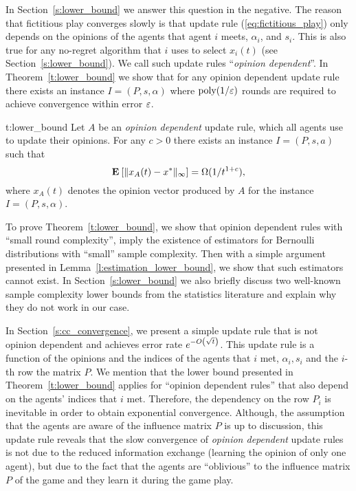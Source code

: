 In Section~\ref{s:lower_bound} we answer this question in the negative.
The reason that fictitious play converges slowly is that
update rule (\ref{eq:fictitious_play})
only depends on the opinions of the agents that agent $i$ meets,
$\alpha_i$, and $s_i$. This is also true for any no-regret algorithm
that $i$ uses to select $x_i(t)$ (see Section~\ref{s:lower_bound}).
We call such update rules \enquote{\emph{opinion dependent}}.
In Theorem~\ref{t:lower_bound} we
show that for any opinion dependent update rule there exists an instance
$I = (P,s,\alpha)$ where $\mathrm{poly}(1/\varepsilon)$ rounds are required to
achieve convergence within error $\varepsilon$.
\begin{reptheorem}{t:lower_bound}
  Let $A$ be an \emph{opinion dependent} update rule, which all
  agents use to update their opinions.
  For any $c>0$ there exists an instance $I=(P,s,a)$ such that
  \[
    \Exp{\norm{\infty}{x_A(t) - x^*}} = \Omega(1/t^{1+c}),
  \]
  where $x_A(t)$ denotes the opinion vector produced by $A$
  for the instance $I=(P,s,\alpha)$.
\end{reptheorem}
%
To prove Theorem~\ref{t:lower_bound}, we show that opinion dependent rules with
\enquote{small round complexity}, imply the existence
of estimators for Bernoulli distributions with
\enquote{small} sample complexity. Then with a simple argument
presented in Lemma~\ref{l:estimation_lower_bound},
we show that such estimators cannot exist.
In Section~\ref{s:lower_bound} we also
briefly discuss two well-known sample complexity lower bounds
from the statistics literature and explain why they do not work in our case.

In Section~\ref{s:cc_convergence}, we present a simple update rule that
is not opinion dependent and  achieves error rate $e^{-O\left(\sqrt{t}\right)}$.
This update rule is a function of the opinions and the indices of the agents
that $i$ met, $\alpha_i,s_i$ and the $i$-th row the matrix $P$.
We mention that the lower bound presented in Theorem~\ref{t:lower_bound}
applies for \enquote{opinion dependent rules} that also depend on the
agents' indices that $i$ met.  Therefore, the dependency on the row $P_i$ is
inevitable in order to obtain exponential convergence.
Although, the assumption that the agents are aware of the influence matrix
$P$ is up to discussion, this update rule reveals that the slow convergence of
\emph{opinion dependent} update rules is not due to the reduced information exchange
(learning the opinion of only one agent), but due to the fact
that the agents are \enquote{oblivious} to the influence matrix $P$ of the
game and they learn it during the game play.

